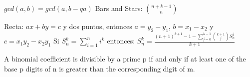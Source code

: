 {\normalsize
    $ gcd(a,b) = gcd(a, b-qa)$
    \hspace{4em} Bars and Stars: $ \binom{n+k-1}{n} $
    
    Recta: $ax + by = c$ y dos puntos, entonces $a = y_2-y_1$, $b = x_1-x_2$ y $c = x_1y_2-x_2y_1$
    Si $S_{n}^{k} = \sum_{i=1}^{n} i^k$ entonces: $S_{n}^{k} = \frac{ (n+1)^{k+1} - 1 - \sum_{j=0}^{k-1} {{k+1} \choose j} S_n^j }{ k+1 }$

    A binomial coefficient {}{} is divisible by a prime p if and only if at least one of the base p digits of n is greater than the corresponding digit of m.
}


